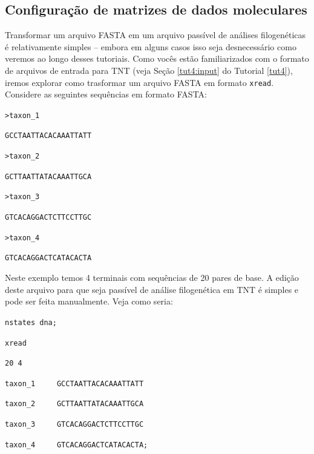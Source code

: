 \begin{refsection}
\section{Configuração de matrizes de dados moleculares}\label{tut7:matrices}

Transformar um arquivo FASTA em um arquivo passível de análises filogenéticas é relativamente simples -- embora em alguns casos isso seja desnecessário como veremos ao longo desses tutoriais. Como vocês estão familiarizados com o formato de arquivos de entrada para TNT (veja Seção \ref{tut4:input} do Tutorial \ref{tut4}), iremos explorar como trasformar um arquivo FASTA em formato \texttt{xread}.\\

	Considere as seguintes sequências em formato FASTA:\\

\scriptsize

\noindent\texttt{>taxon\_1}

\noindent\texttt{GCCTAATTACACAAATTATT}

\noindent\texttt{>taxon\_2}

\noindent\texttt{GCTTAATTATACAAATTGCA}

\noindent\texttt{>taxon\_3}

\noindent\texttt{GTCACAGGACTCTTCCTTGC}

\noindent\texttt{>taxon\_4}

\noindent\texttt{GTCACAGGACTCATACACTA}


\normalsize

\vspace{0.5cm}

Neste exemplo temos 4 terminais com sequências de 20 pares de base. A edição deste arquivo para que seja passível de análise filogenética em TNT é simples e pode ser feita manualmente. Veja como seria:\\


\scriptsize

\noindent\texttt{nstates dna;}

\noindent\texttt{xread}

\noindent\texttt{20 4}


\noindent\texttt{taxon\_1~~~~~GCCTAATTACACAAATTATT}


\noindent\texttt{taxon\_2~~~~~GCTTAATTATACAAATTGCA}


\noindent\texttt{taxon\_3~~~~~GTCACAGGACTCTTCCTTGC}


\noindent\texttt{taxon\_4~~~~~GTCACAGGACTCATACACTA;}


\end{refsection}
